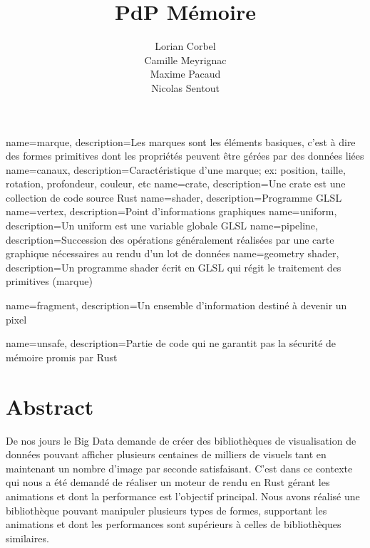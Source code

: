 \documentclass[12pt]{article}
\title{\gls{PdP} \smallbreak Mémoire }
\author{Lorian Corbel \\ Camille Meyrignac \\ Maxime Pacaud \\ Nicolas Sentout}
\begin{document}

{
    name=marque,
    description={Les marques sont les éléments basiques, c'est à dire des formes primitives dont les
    propriétés peuvent être gérées par des données liées}
}
{
    name=canaux,
    description={Caractéristique d'une marque; ex: position, taille, rotation, profondeur, couleur, etc}
}
{
    name=crate,
    description={Une crate est une collection de code source Rust}
}
{
    name=shader,
    description={Programme GLSL}
}
{
    name=vertex,
    description={Point d'informations graphiques}
}
{
    name=uniform,
    description={Un uniform est une variable globale GLSL}
}
{
    name=pipeline,
    description={Succession des opérations généralement réalisées par une carte graphique nécessaires au
    rendu d'un lot de données}
}
{
    name={geometry shader},
    description={Un programme shader écrit en GLSL qui régit le traitement des primitives (marque)}
}

{
    name={fragment},
    description={Un ensemble d'information destiné à devenir un pixel}
}


{
    name={unsafe},
    description={Partie de code qui ne garantit pas la sécurité de mémoire promis par Rust}
}

\maketitle
\tableofcontents
\newpage

\section{Abstract}

De nos jours le Big Data demande de créer des bibliothèques de visualisation de données pouvant afficher plusieurs centaines de milliers de visuels tant en maintenant un nombre d'image par seconde satisfaisant.
C'est dans ce contexte qui nous a été demandé de réaliser un moteur de rendu en Rust gérant les animations et dont la performance est l'objectif principal. Nous avons réalisé une bibliothèque pouvant manipuler plusieurs types de formes, supportant les animations et dont les performances sont supérieurs à celles de bibliothèques similaires.
\end{document}
